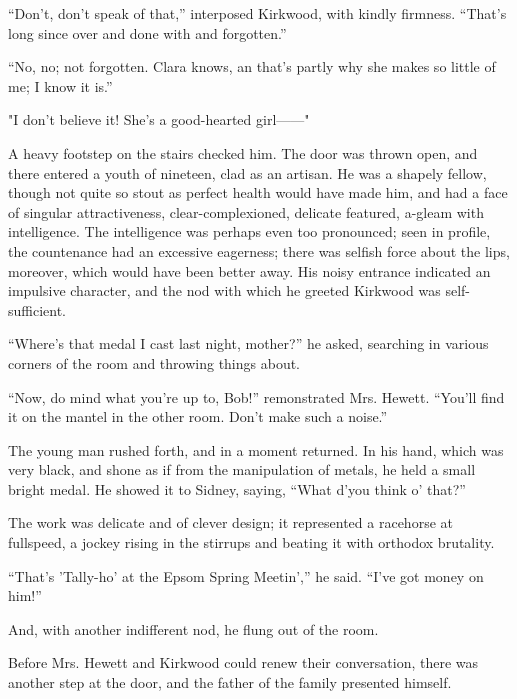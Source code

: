 ``Don't, don't speak of that,'' interposed Kirkwood, with kindly
firmness. ``That's long since over and done with and forgotten.''

{}``No, no; not forgotten. Clara knows, an that's partly why she makes
so little of me; I know it is.''

"I don't believe it! She's a good-hearted girl{{------}}"

A heavy footstep on the stairs checked him. The door was thrown open,
and there entered a youth of nineteen, clad as an artisan. He was a
shapely fellow, though not quite so stout as perfect health would have
made him, and had a face of singular attractiveness, clear-complexioned,
delicate featured, a-gleam with intelligence. The intelligence was
perhaps even too pronounced; seen in profile, the countenance had an
excessive eagerness; there was selfish force about the lips, moreover,
which would have been better away. His noisy entrance indicated an
impulsive character, and the nod with which he greeted Kirkwood was
self-sufficient.

``Where's that medal I cast last night, mother?'' he asked, searching in
various corners of the room and throwing things about.

{}``Now, do mind what you're up to, Bob!'' remonstrated Mrs. Hewett.
``You'll find it on the mantel in the other room. Don't make such a
noise.''

The young man rushed forth, and in a moment returned. In his hand, which
was very black, and shone as if from the manipulation of metals, he held
a small bright medal. He showed it to Sidney, saying, ``What d'you think
o' that?''

The work was delicate and of clever design; it represented a racehorse
at fullspeed, a jockey rising in the stirrups and beating it with
orthodox brutality.

``That's 'Tally-ho' at the Epsom Spring Meetin','' he said. ``I've got
money on him!''

And, with another indifferent nod, he flung out of the room.

Before Mrs. Hewett and Kirkwood could renew their conversation, there
was another step at the door, and the father of the family presented
himself.
